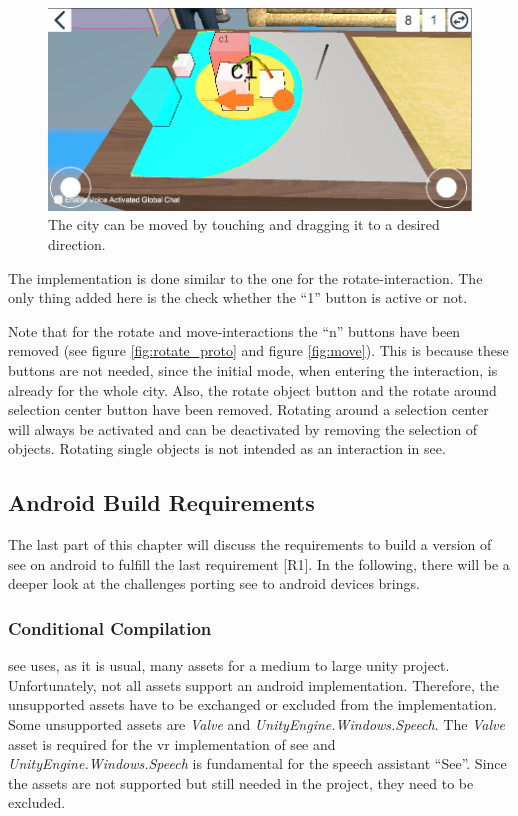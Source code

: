 \begin{figure}[htb]
    \centering
    \includegraphics[width=1\textwidth]{Implementation/img/move.png}
    \caption{The \gls{city} can be moved by touching and dragging it to a desired direction.}\label{fig:left}
\end{figure}

The implementation is done similar to the one for the rotate-interaction. 
The only thing added here is the check whether the \enquote{1} button is active or not.

Note that for the rotate and move-interactions the \enquote{n} buttons have been removed (see figure \ref{fig:rotate_proto} and figure \ref{fig:move}).
This is because these buttons are not needed, since the initial mode, when entering the interaction, is already for the whole \gls{city}.
Also, the rotate object button and the rotate around selection center button have been removed. 
Rotating around a selection center will always be activated and can be deactivated by removing the selection of objects.
Rotating single objects is not intended as an interaction in \gls{see}.

\subsection{Android Build Requirements}
The last part of this chapter will discuss the requirements to build a version of \gls{see} on \gls{android} to fulfill the last requirement [R1].
In the following, there will be a deeper look at the challenges porting \gls{see} to \gls{android} devices brings. 


\subsubsection{Conditional Compilation}

\gls{see} uses, as it is usual, many \glspl{asset} for a medium to large \gls{unity} project.
Unfortunately, not all \glspl{asset} support an \gls{android} implementation.
Therefore, the unsupported assets have to be exchanged or excluded from the implementation.
Some unsupported \glspl{asset} are \textit{Valve} and \textit{UnityEngine.Windows.Speech}.
The \textit{Valve} \gls{asset} is required for the \gls{vr} implementation of \gls{see} and \textit{UnityEngine.Windows.Speech} is fundamental for the speech assistant \enquote{See}.
Since the \glspl{asset} are not supported but still needed in the project, they need to be excluded. 

